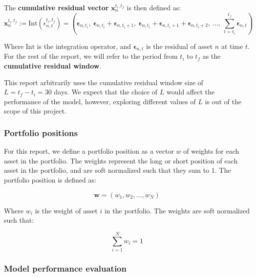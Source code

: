 \documentclass[12pt]{article}
\begin{document}
\noindent
The \textbf{cumulative residual vector} $\mathbf{x}_n^{t_i, t_f}$ is then defined as:
\begin{equation}
    \mathbf{x}_n^{t_i, t_f} := \mathrm{Int}(\epsilon^{t_i, t_f}_{n,t}) 
      = \left( \mathbf{\epsilon}_{n,t_i},\ \mathbf{\epsilon}_{n,t_i} + \mathbf{\epsilon}_{n,t_i+1},\ \mathbf{\epsilon}_{n,t_i} + \mathbf{\epsilon}_{n,t_i+1} + \mathbf{\epsilon}_{n,t_i+2},\ \ldots,\ \sum_{t=t_i}^{t_f} \mathbf{\epsilon}_{n,t} \right)
    \label{eq:cumulative_residual}
\end{equation}

\noindent
Where $\mathrm{Int}$ is the integration operator, and $\mathbf{\epsilon}_{n,t}$ is the residual of asset $n$ at time $t$. For the rest of the report, we will refer to the period from $t_i$ to $t_f$ as the \textbf{cumulative residual window}.

\vspace{10pt}
\noindent
This report arbitrarily uses the cumulative residual window size of $L=t_f-t_i=30$ days. We expect that the choice of $L$ would affect the performance of the model, however, exploring different values of $L$ is out of the scope of this project.

\subsubsection{Portfolio positions}

For this report, we define a portfolio position as a vector $w$ of weights for each asset in the portfolio. The weights represent the long or short position of each asset in the portfolio, and are soft normalized such that they sum to 1. The portfolio position is defined as:

\begin{equation}
    \mathbf{w} = (w_1, w_2, \ldots, w_N)
    \label{eq:portfolio_weights}
\end{equation}

\noindent
Where $w_i$ is the weight of asset $i$ in the portfolio. The weights are soft normalized such that:

\begin{equation}
    \sum_{i=1}^{N} w_i = 1
    \label{eq:portfolio_weights_normalization}
\end{equation}

\subsubsection{Model performance evaluation} 
\end{document}

